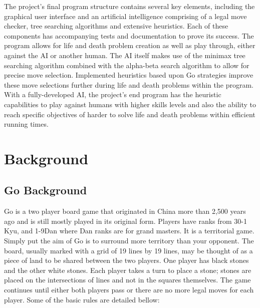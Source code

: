 \documentclass{l3proj}
\begin{document}
The project's final program structure contains several key elements, including the graphical user interface and an artificial intelligence comprising of a legal move checker, tree searching algorithms and extensive heuristics. Each of these components has accompanying tests and documentation to prove its success. The program allows for life and death problem creation as well as play through, either against the AI or another human. The AI itself makes use of the minimax tree searching algorithm combined with the alpha-beta search algorithm to allow for precise move selection. Implemented heuristics based upon Go strategies improve these move selections further during life and death problems within the program. With a fully-developed AI, the project's end program has the heuristic capabilities to play against humans with higher skills levels and also the ability to reach specific objectives of harder to solve life and death problems within efficient running times.

\chapter{Background}
\label{background}

\section{Go Background}

Go is a two player board game that originated in China more than 2,500 years ago and is still mostly played in its original form.  Players have ranks from 30-1 Kyu, and 1-9Dan where Dan ranks are for grand masters. It is a territorial game. Simply put the aim of Go is to surround more territory than your opponent. The board, usually marked with a grid of 19 lines by 19 lines, may be thought of as a piece of land to be shared between the two players. One player has black stones and the other white stones. Each player takes a turn to place a stone; stones are placed on the intersections of lines and not in the squares themselves. The game continues until either both players pass or there are no more legal moves for each player.  Some of the basic rules are detailed bellow:
\end{document}
